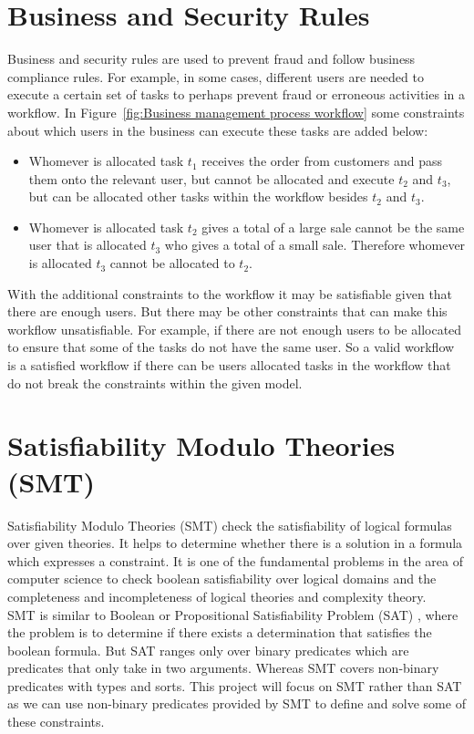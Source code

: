 \documentclass[a4paper]{report}
\begin{document}
\section{Business and Security Rules}
Business and security rules are used to prevent fraud and follow business compliance rules. For example, in some cases, different users are needed to execute a certain set of tasks to perhaps prevent fraud or erroneous activities in a workflow. In Figure~\ref{fig:Business management process workflow} some constraints about which users in the business can execute these tasks are added below:
\begin{itemize}
\item Whomever is allocated task $t_{1}$ receives the order from customers and pass them onto the relevant user, but cannot be allocated and execute $t_{2}$ and $t_{3}$, but can be allocated other tasks within the workflow besides $t_{2}$ and $t_{3}$.
\item Whomever is allocated task $t_{2}$ gives a total of a large sale cannot be the same user that is allocated $t_{3}$ who gives a total of a small sale. Therefore whomever is allocated $t_{3}$ cannot be allocated to $t_{2}$.
\end{itemize}

With the additional constraints to the workflow it may be satisfiable given that there are enough users. But there may be other constraints that can make this workflow unsatisfiable. For example, if there are not enough users to be allocated to ensure that some of the tasks do not have the same user. So a valid workflow is a satisfied workflow if there can be users allocated tasks in the workflow that do not break the constraints within the given model.\\

\section{Satisfiability Modulo Theories (SMT)}
Satisfiability Modulo Theories (SMT)\cite{smt_appetizer} check the satisfiability of logical formulas over given theories. It helps to determine whether there is a solution in a formula which expresses a constraint. It is one of the fundamental problems in the area of computer science to check boolean satisfiability over logical domains and the completeness and incompleteness of logical theories and complexity theory. \\

SMT is similar to Boolean or Propositional Satisfiability Problem (SAT)\cite{sat} , where the problem is to determine if there exists a determination that satisfies the boolean formula. But SAT ranges only over binary predicates which are predicates that only take in two arguments. Whereas SMT covers non-binary predicates with types and sorts. This project will focus on SMT rather than SAT as we can use non-binary predicates provided by SMT to define and solve some of these constraints. \\
\end{document}
